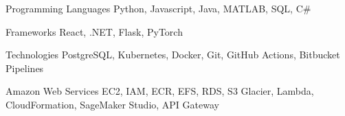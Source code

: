 
\begin{cvskills}
  \cvskill 
    {Programming Languages}
    {Python, Javascript, Java, MATLAB, SQL, C\#}

  \cvskill
    {Frameworks}
    {React, .NET, Flask, PyTorch}

    \cvskill 
    {Technologies}
    {PostgreSQL, Kubernetes, Docker, Git, GitHub Actions, Bitbucket Pipelines}


    \cvskill 
    {Amazon Web Services}
    {EC2, IAM, ECR, EFS, RDS, S3 Glacier, Lambda, CloudFormation, SageMaker Studio, API Gateway}


\end{cvskills}
